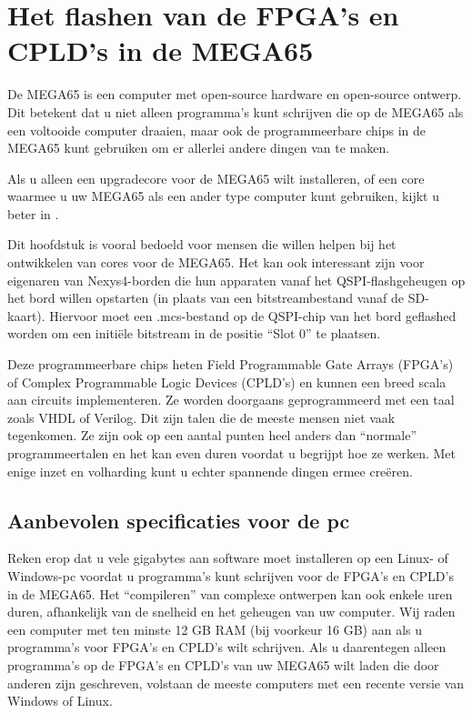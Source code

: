 \chapter{Het flashen van de FPGA's en CPLD's in de MEGA65}
\label{cha:fpgacpldflashing}

De MEGA65 is een computer met open-source hardware en open-source ontwerp. Dit betekent dat u niet alleen programma's kunt schrijven die op de MEGA65 als een voltooide computer draaien, maar ook de programmeerbare chips in de MEGA65 kunt gebruiken om er allerlei andere dingen van te maken.

Als u alleen een upgradecore voor de MEGA65 wilt installeren, of een core waarmee u uw MEGA65 als een ander type computer kunt gebruiken, kijkt u beter in .

Dit hoofdstuk is vooral bedoeld voor mensen die willen helpen bij het ontwikkelen van cores voor de MEGA65. Het kan ook interessant zijn voor eigenaren van Nexys4-borden die hun apparaten vanaf het QSPI-flashgeheugen op het bord willen opstarten (in plaats van een bitstreambestand vanaf de SD-kaart). Hiervoor moet een .mcs-bestand op de QSPI-chip van het bord geflashed worden om een initiële bitstream in de positie ``Slot 0'' te plaatsen.

Deze programmeerbare chips heten Field Programmable Gate Arrays (FPGA's) of Complex Programmable Logic Devices (CPLD's) en kunnen een breed scala aan circuits implementeren. Ze worden doorgaans geprogrammeerd met een taal zoals VHDL of Verilog. Dit zijn talen die de meeste mensen niet vaak tegenkomen. Ze zijn ook op een aantal punten heel anders dan ``normale'' programmeertalen en het kan even duren voordat u begrijpt hoe ze werken. Met enige inzet en volharding kunt u echter spannende dingen ermee creëren.

\section{Aanbevolen specificaties voor de pc}

Reken erop dat u vele gigabytes aan software moet installeren op een Linux- of Windows-pc voordat u programma's kunt schrijven voor de FPGA's en CPLD's in de MEGA65. Het ``compileren'' van complexe ontwerpen kan ook enkele uren duren, afhankelijk van de snelheid en het geheugen van uw computer. Wij raden een computer met ten minste 12 GB RAM (bij voorkeur 16 GB) aan als u programma's voor FPGA's en CPLD's wilt schrijven. Als u daarentegen alleen programma's op de FPGA's en CPLD's van uw MEGA65 wilt laden die door anderen zijn geschreven, volstaan de meeste computers met een recente versie van Windows of Linux.

